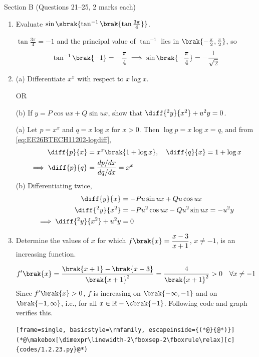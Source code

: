 \vspace{2mm}
\noindent Section B (Questions 21--25, 2 marks each)
\begin{enumerate}[label=\thesubsection.\arabic*, ref=\thesubsection.\theenumi, start=21]
\item Evaluate $\sin\sbrak{\tan^{-1}\brak{\tan\frac{3\pi}{4}}}$.
\par\solution
$\tan\frac{3\pi}{4} = -1$ and the principal value of $\tan^{-1}$ lies in $\brak{-\frac{\pi}{2},\frac{\pi}{2}}$, so
\begin{align}
	\tan^{-1}\brak{-1} = -\frac{\pi}{4}
	\implies \sin\brak{-\frac{\pi}{4}} = -\frac{1}{\sqrt{2}}
\end{align}

\item 
(a) Differentiate $x^x$ with respect to $x\log x$.

OR

(b) If $y = P\cos ux + Q\sin ux$, show that $\diff{^2y}{x^2} + u^2y = 0$.
\par\solution
(a) Let $p = x^x$ and $q = x\log x$ for $x > 0$. Then $\log p = x\log x = q$, and from \eqref{eq:EE26BTECH11202-logdiff},
\begin{align}
	\diff{p}{x} &= x^x\brak{1+\log x}, \quad \diff{q}{x} = 1 + \log x
	\\
	\implies \diff{p}{q} &= \frac{dp/dx}{dq/dx} = x^x
\end{align}
(b) Differentiating twice,
\begin{align}
	\diff{y}{x} &= -Pu\sin ux + Qu\cos ux
	\\
	\diff{^2y}{x^2} &= -Pu^2\cos ux - Qu^2\sin ux = -u^2 y
	\\
	\implies \diff{^2y}{x^2} + u^2y &= 0
\end{align}


\item Determine the values of $x$ for which $f\brak{x} = \dfrac{x-3}{x+1}$, $x \ne -1$, is an increasing function.
\par\solution
\begin{align}
	f^{\prime}\brak{x} = \frac{\brak{x+1} - \brak{x-3}}{\brak{x+1}^2} = \frac{4}{\brak{x+1}^2} > 0
	\quad \forall x \ne -1
\end{align}
Since $f^{\prime}\brak{x} > 0$, $f$ is increasing on $\brak{-\infty,-1}$ and on $\brak{-1,\infty}$, i.e., for all $x \in \mathbb{R}-\cbrak{-1}$.
Following code and graph verifies this.


\begin{lstlisting}[frame=single, basicstyle=\rmfamily, escapeinside={(*@}{@*)}]
(*@\makebox[\dimexpr\linewidth-2\fboxsep-2\fboxrule\relax][c]{codes/1.2.23.py}@*)
\end{lstlisting}




\end{enumerate}
